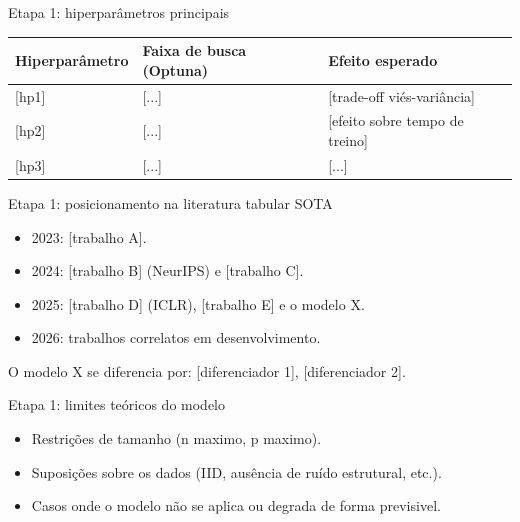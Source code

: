 \documentclass[aspectratio=169,11pt]{beamer}
\begin{document}
\begin{frame}{Etapa 1: hiperparâmetros principais}
    \footnotesize
    \begin{tabular}{l p{4cm} p{4.5cm}}
        \toprule
        \textbf{Hiperparâmetro} & \textbf{Faixa de busca (Optuna)} & \textbf{Efeito esperado} \\
        \midrule
        {}[hp1] & [...] & [trade-off viés-variância] \\
        {}[hp2] & [...] & [efeito sobre tempo de treino] \\
        {}[hp3] & [...] & [...] \\
        \bottomrule
    \end{tabular}
\end{frame}

\begin{frame}{Etapa 1: posicionamento na literatura tabular SOTA}
    \begin{itemize}
        \item 2023: [trabalho A].
        \item 2024: [trabalho B] (NeurIPS) e [trabalho C].
        \item 2025: [trabalho D] (ICLR), [trabalho E] e o modelo X.
        \item 2026: trabalhos correlatos em desenvolvimento.
    \end{itemize}
    \vspace{0.3em}
    \footnotesize O modelo X se diferencia por: [diferenciador 1], [diferenciador 2].
\end{frame}

\begin{frame}{Etapa 1: limites teóricos do modelo}
    \begin{itemize}
        \item Restrições de tamanho (n maximo, p maximo).
        \item Suposições sobre os dados (IID, ausência de ruído estrutural, etc.).
        \item Casos onde o modelo não se aplica ou degrada de forma previsivel.
    \end{itemize}
\end{frame}

\end{document}
